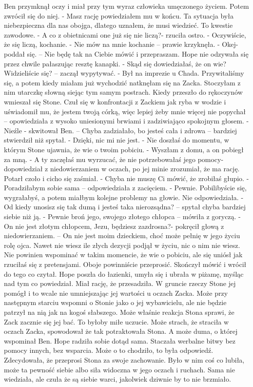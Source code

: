 \documentclass[12pt,a4paper]{book}
\begin{document}
Ben przymknął oczy i miał przy tym wyraz człowieka umęczonego życiem. Potem zwrócił się do niej. 
- Masz rację powiedziałem mu w końcu. Ta sytuacja była niebezpieczna dla nas obojga, dlatego uznałem, że musi wiedzieć. To kwestie zawodowe. 
- A co z obietnicami one już się nie liczą?- rzuciła ostro. 
- Oczywiście, że się liczą, kochanie.
- Nie mów na mnie kochanie – prawie krzyknęła. 
- Okej- poddał się. – Nie będę tak na Ciebie mówić i przepraszam. 
Hope nie odzywała się przez chwile pałaszując resztę kanapki. 
- Skąd się dowiedziałaś, że on wie? Widzieliście się? – zaczął wypytywać. 
- Był na imprezie u Chada. Przywitaliśmy się, a potem kiedy miałam już wychodzić natknęłam się na Zacka. Stoczyłam z nim utarczkę słowną siejąc tym samym postrach. Kiedy przeszło do rękoczynów wmieszał się Stone. Czuł się w konfrontacji z Zackiem jak ryba w wodzie i uświadomił mu, że jestem twoją córką, więc lepiej żeby mnie więcej nie popychał – opowiedziała z wysoko uniesionymi brwiami i zadziwiająco spokojnym głosem.
- Nieźle - skwitował Ben. – Chyba zadziałało, bo jesteś cała i zdrowa – bardziej stwierdził niż spytał. 
- Dzięki, nic mi nie jest. 
- Nie doszłaś do momentu, w którym Stone ujawnia, że wie o twoim pobiciu.
- Wyszłam z domu, a on pobiegł za mną. 
- A ty zaczęłaś mu wyrzucać, że nie potrzebowałaś jego pomocy- dopowiedział z niedowierzaniem w oczach, po jej minie zrozumiał, że ma rację. 
Potarł czoło i cicho się zaśmiał. 
- Chyba nie muszę Ci mówić, że zrobiłaś głupio. 
- Poradziłabym sobie sama – odpowiedziała z zacięciem. 
- Pewnie. Pobilibyście się, wygrałabyś, a potem miałbym kolejne problemy na głowie. 
Nie odpowiedziała.
- Od kiedy unosisz się tak dumą i jesteś taka nierozsądna? – spytał chyba bardziej siebie niż ją. 
- Pewnie broń jego, swojego złotego chłopca – mówiła z goryczą. 
- On nie jest złotym chłopcem, Jezu, będziesz zazdrosna?- pokręcił głową z niedowierzaniem. – On nie jest moim dzieckiem, choć może pełnię w jego życiu rolę ojca. Nawet nie wiesz ile złych dezycji podjął w życiu, nic o nim nie wiesz. Nie powinien wspominać w takim momencie, że wie o pobiciu, ale się uniósł jak rzuciłaś się z pretensjami. Oboje powinniście przeprosić. 
Skończył mówić i wrócił do tego co czytał. Hope poszła do łazienki, umyła się i ubrała w piżamę, myśląc nad tym co powiedział. Miał rację, że przesadziła. W gruncie rzeczy Stone jej pomógł i to wcale nie umniejszając jej wartości u oczach Zacka. Może przy następnym starciu wspomni o Stonie jako o jej wybawicielu, ale nie będzie patrzył na nią jak na kogoś słabszego. Może właśnie reakcja 
Stona sprawi, że Zack zacznie się jej bać. To byłoby miłe uczucie. Może strach, że straciła w oczach Zacka, spowodował że tak potraktowała Stona. A może duma, o której wspominał Ben. Hope radziła sobie dotąd sama. Staczała werbalne bitwy bez pomocy innych, bez wsparcia. Może o to chodziło, to była odpowiedź. Zdecydowała, że przeprosi Stona za swoje zachowanie. Było w nim coś co lubiła, może ta pewność siebie albo siła widoczna w jego oczach i ruchach. Sama nie wiedziała, ale czuła że są siebie warci, jakolwiek dziwnie by to nie brzmiało. 
\end{document}
